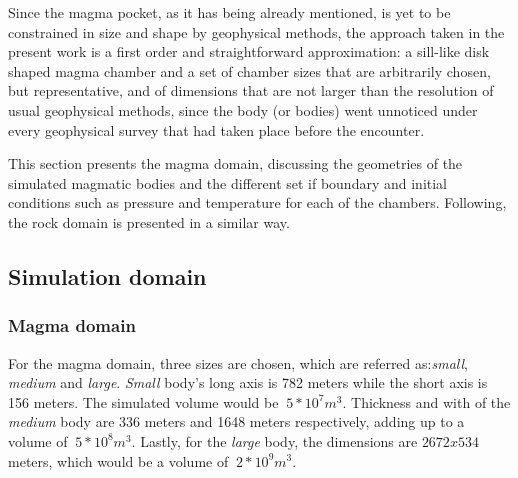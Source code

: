 Since the magma pocket, as it has being already mentioned, is yet to be constrained in size and shape by geophysical methods, the approach taken in the present work is a first order and straightforward approximation: a sill-like disk shaped magma chamber and a set of chamber sizes that are arbitrarily chosen, but representative, and of dimensions that are not larger than the resolution of usual geophysical methods, since the body (or bodies) went unnoticed under every geophysical survey that had taken place before the encounter. 

This section presents the magma domain, discussing the geometries of the simulated magmatic bodies and the different set if boundary and initial conditions such as pressure and temperature for each of the chambers. Following, the rock domain is presented in a similar way.
\subsection{Simulation domain}
\subsubsection{Magma domain}
For the magma domain, three sizes are chosen, which are referred as:\textit{small}, \textit{medium} and \textit{large}.
\textit{Small} body's long axis is 782 meters while the short axis is 156 meters. The simulated volume would be $~5*10^7 m^3$. 
Thickness and with of the \textit{medium} body are 336 meters and 1648 meters respectively, adding up to a volume of $~5*10^8 m^3$. 
Lastly, for the \textit{large} body, the dimensions are $2672x534$ meters, which would be a volume of $~2*10^9 m^3$. 

